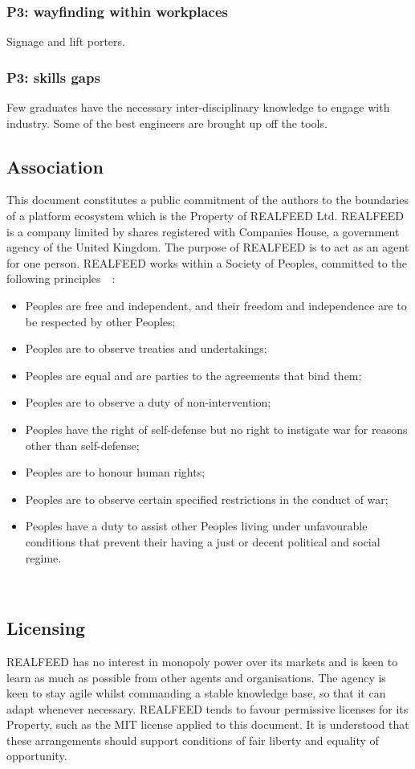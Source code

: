 \documentclass[11pt, oneside]{article}   	%
\begin{document}
\subsubsection{P3: wayfinding within workplaces}
Signage and lift porters.

\subsubsection{P3: skills gaps}
Few graduates have the necessary inter-disciplinary knowledge to engage with industry.
Some of the best engineers are brought up off the tools.

\subsection{Association}
This document constitutes a public commitment of the authors to the boundaries of a platform ecosystem which is the Property of REALFEED Ltd.
REALFEED is a company limited by shares registered with Companies House, a government agency of the United Kingdom.
The purpose of REALFEED is to act as an agent for one person.
REALFEED works within a Society of Peoples, committed to the following principles~\cite{jlb1}~\cite{tn1}:
\begin{itemize}
	\item Peoples are free and independent, and their freedom and independence are to be respected by other Peoples;
	\item Peoples are to observe treaties and undertakings;
	\item Peoples are equal and are parties to the agreements that bind them;
	\item Peoples are to observe a duty of non-intervention;
	\item Peoples have the right of self-defense but no right to instigate war for reasons other than self-defense;
	\item Peoples are to honour human rights;
	\item Peoples are to observe certain specified restrictions in the conduct of war;
	\item Peoples have a duty to assist other Peoples living under unfavourable conditions that prevent their having a just or decent political and social regime.
\end{itemize}\

\subsection{Licensing}
REALFEED has no interest in monopoly power over its markets and is keen to learn as much as possible from other agents and organisations.
The agency is keen to stay agile whilst commanding a stable knowledge base, so that it can adapt whenever necessary.
REALFEED tends to favour permissive licenses for its Property, such as the MIT license applied to this document.
It is understood that these arrangements should support conditions of fair liberty and equality of opportunity. 
\end{document}
